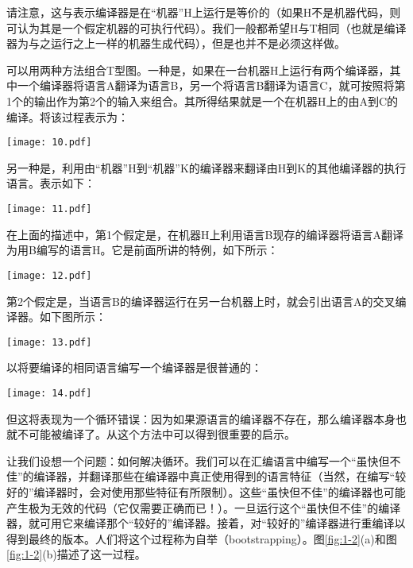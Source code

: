 \documentclass[lang=cn,10pt]{elegantbook}
\begin{document}
请注意，这与表示编译器是在“机器”H上运行是等价的（如果H不是机器代码，则可认为其是一个假定机器的可执行代码）。我们一般都希望H与T相同（也就是编译器为与之运行之上一样的机器生成代码），但是也并不是必须这样做。

可以用两种方法组合T型图。一种是，如果在一台机器H上运行有两个编译器，其中一个编译器将语言A翻译为语言B，另一个将语言B翻译为语言C，就可按照将第1个的输出作为第2个的输入来组合。其所得结果就是一个在机器H上的由A到C的编译。将该过程表示为：

\begin{center}
  \texttt{[image: 10.pdf]}
\end{center}

另一种是，利用由“机器”H到“机器”K的编译器来翻译由H到K的其他编译器的执行语言。表示如下：

\begin{center}
  \texttt{[image: 11.pdf]}
\end{center}

在上面的描述中，第1个假定是，在机器H上利用语言B现存的编译器将语言A翻译为用B编写的语言H。它是前面所讲的特例，如下所示：

\begin{center}
  \texttt{[image: 12.pdf]}
\end{center}

第2个假定是，当语言B的编译器运行在另一台机器上时，就会引出语言A的交叉编译器。如下图所示：

\begin{center}
  \texttt{[image: 13.pdf]}
\end{center}

以将要编译的相同语言编写一个编译器是很普通的：

\begin{center}
  \texttt{[image: 14.pdf]}
\end{center}

但这将表现为一个循环错误：因为如果源语言的编译器不存在，那么编译器本身也就不可能被编译了。从这个方法中可以得到很重要的启示。

让我们设想一个问题：如何解决循环。我们可以在汇编语言中编写一个“虽快但不佳”的编译器，并翻译那些在编译器中真正使用得到的语言特征（当然，在编写“较好的”编译器时，会对使用那些特征有所限制）。这些“虽快但不佳”的编译器也可能产生极为无效的代码（它仅需要正确而已！）。一旦运行这个“虽快但不佳”的编译器，就可用它来编译那个“较好的”编译器。接着，对“较好的”编译器进行重编译以得到最终的版本。人们将这个过程称为自举（bootstrapping）。图\ref{fig:1-2}(a)和图\ref{fig:1-2}(b)描述了这一过程。
\end{document}
